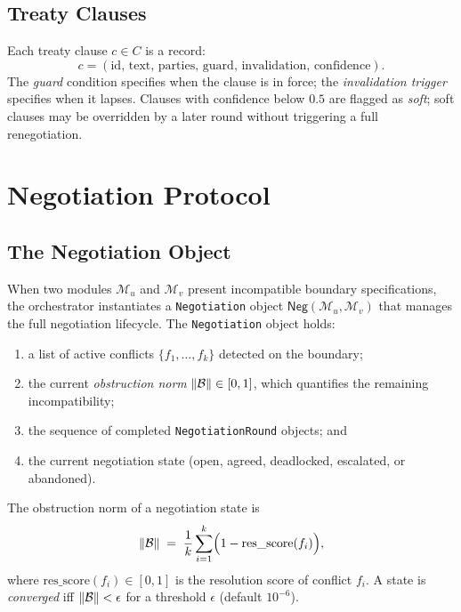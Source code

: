 \documentclass[11pt]{article}
\newcommand{\Neg}{\mathsf{Neg}}           %
\newcommand{\Mod}{\mathcal{M}}            %
\newcommand{\norm}[1]{\lVert #1 \rVert}  %
\newcommand{\ObsNorm}{\norm{\obstr}}      %
\begin{document}
\subsection{Treaty Clauses}

Each treaty clause $c \in C$ is a record:
\[
  c = (\mathrm{id},\, \mathrm{text},\,
       \mathrm{parties},\, \mathrm{guard},\,
       \mathrm{invalidation},\, \mathrm{confidence}).
\]
The \emph{guard} condition specifies when the clause is in force; the
\emph{invalidation trigger} specifies when it lapses.  Clauses with
confidence below $0.5$ are flagged as \emph{soft}; soft clauses may
be overridden by a later round without triggering a full
renegotiation.

\section{Negotiation Protocol}\label{sec:negotiation}

\subsection{The Negotiation Object}

When two modules $\Mod_u$ and $\Mod_v$ present incompatible boundary
specifications, the \JuGeo{} orchestrator instantiates a
\texttt{Negotiation} object $\Neg(\Mod_u, \Mod_v)$ that manages the
full negotiation lifecycle.  The \texttt{Negotiation} object holds:
\begin{enumerate}[noitemsep]
  \item a list of active conflicts $\{f_1, \ldots, f_k\}$ detected
    on the boundary;
  \item the current \emph{obstruction norm} $\ObsNorm \in [0, 1]$,
    which quantifies the remaining incompatibility;
  \item the sequence of completed \texttt{NegotiationRound} objects;
    and
  \item the current negotiation state (open, agreed, deadlocked,
    escalated, or abandoned).
\end{enumerate}

\begin{definition}\label{def:obs-norm}
The obstruction norm of a negotiation state is
\[
  \ObsNorm \;=\;
  \frac{1}{k}\sum_{i=1}^{k}
  \Bigl(1 - \mathrm{res\_score}(f_i)\Bigr),
\]
where $\mathrm{res\_score}(f_i) \in [0,1]$ is the resolution score
of conflict $f_i$.  A state is \emph{converged} iff $\ObsNorm < \epsilon$
for a threshold $\epsilon$ (default $10^{-6}$).
\end{definition}
\end{document}
